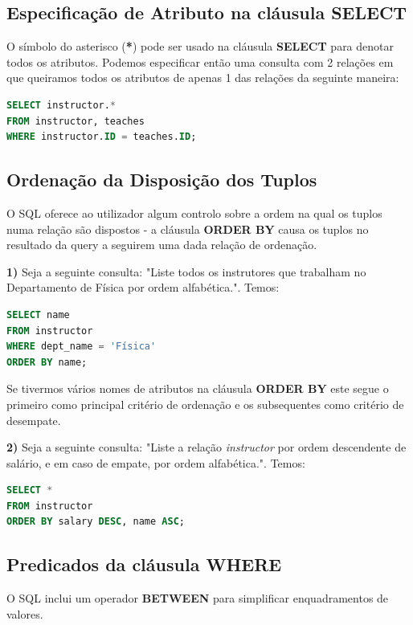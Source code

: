 \documentclass[oneside]{book}
\theoremstyle{definition}
\begin{document}
\subsection{Especificação de Atributo na cláusula SELECT}
O símbolo do asterisco (\textbf{*}) pode ser usado na cláusula \textbf{SELECT} para denotar todos os atributos. Podemos especificar então uma consulta com 2 relações em que queiramos todos os atributos de apenas 1 das relações da seguinte maneira:
\begin{lstlisting}[language=SQL, morekeywords={REFERENCES, REFRESH, MATERIALIZED, CONCURRENTLY}, framesep=8pt, xleftmargin=40pt, framexleftmargin=40pt, frame=tb, framerule=0pt]
SELECT instructor.*
FROM instructor, teaches
WHERE instructor.ID = teaches.ID;
\end{lstlisting}

\subsection{Ordenação da Disposição dos Tuplos}
O SQL oferece ao utilizador algum controlo sobre a ordem na qual os tuplos numa relação são dispostos - a cláusula \textbf{ORDER BY} causa os tuplos no resultado da query a seguirem uma dada relação de ordenação. 

\textbf{1)} Seja a seguinte consulta: "Liste todos os instrutores que trabalham no Departamento de Física por ordem alfabética.". Temos:
\begin{lstlisting}[language=SQL, morekeywords={REFERENCES, REFRESH, MATERIALIZED, CONCURRENTLY}, framesep=8pt, xleftmargin=40pt, framexleftmargin=40pt, frame=tb, framerule=0pt]
SELECT name
FROM instructor
WHERE dept_name = 'Física'
ORDER BY name;
\end{lstlisting}

Se tivermos vários nomes de atributos na cláusula \textbf{ORDER BY} este segue o primeiro como principal critério de ordenação e os subsequentes como critério de desempate.

\textbf{2)} Seja a seguinte consulta: "Liste a relação \textit{instructor} por ordem descendente de salário, e em caso de empate, por ordem alfabética.". Temos:
\begin{lstlisting}[language=SQL, morekeywords={REFERENCES, REFRESH, MATERIALIZED, CONCURRENTLY}, framesep=8pt, xleftmargin=40pt, framexleftmargin=40pt, frame=tb, framerule=0pt]
SELECT *
FROM instructor
ORDER BY salary DESC, name ASC;
\end{lstlisting}

\subsection{Predicados da cláusula WHERE}
O SQL inclui um operador \textbf{BETWEEN} para simplificar enquadramentos de valores.
\end{document}
